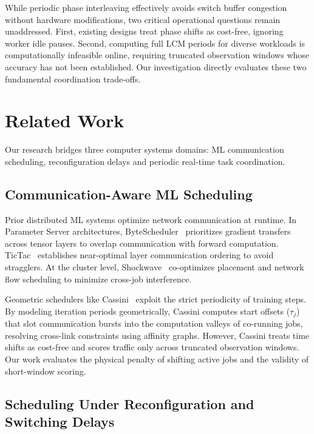 \documentclass[conference]{IEEEtran}
\begin{document}
While periodic phase interleaving effectively avoids switch buffer congestion without hardware modifications, two critical operational questions remain unaddressed. First, existing designs treat phase shifts as cost-free, ignoring worker idle pauses. Second, computing full LCM periods for diverse workloads is computationally infeasible online, requiring truncated observation windows whose accuracy has not been established. Our investigation directly evaluates these two fundamental coordination trade-offs.

\section{Related Work}
\label{sec:related-work}

Our research bridges three computer systems domains: ML communication scheduling, reconfiguration delays and periodic real-time task coordination.

\subsection{Communication-Aware ML Scheduling}

Prior distributed ML systems optimize network communication at runtime. In Parameter Server architectures, ByteScheduler~\cite{bytescheduler} prioritizes gradient transfers across tensor layers to overlap communication with forward computation. TicTac~\cite{tictac} establishes near-optimal layer communication ordering to avoid stragglers. At the cluster level, Shockwave~\cite{shockwave} co-optimizes placement and network flow scheduling to minimize cross-job interference.

Geometric schedulers like Cassini~\cite{cassini} exploit the strict periodicity of training steps. By modeling iteration periods geometrically, Cassini computes start offsets ($\tau_j$) that slot communication bursts into the computation valleys of co-running jobs, resolving cross-link constraints using affinity graphs. However, Cassini treats time shifts as cost-free and scores traffic only across truncated observation windows. Our work evaluates the physical penalty of shifting active jobs and the validity of short-window scoring.

\subsection{Scheduling Under Reconfiguration and Switching Delays}
\end{document}
